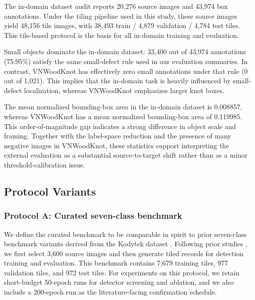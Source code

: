 \documentclass[10pt,a4paper]{article}
\begin{document}
The in-domain dataset audit reports 20,276 source images and 43,974 box annotations. Under the tiling pipeline used in this study, these source images yield 48,156 tile images, with 38,493 train / 4,879 validation / 4,784 test tiles. This tile-based protocol is the basis for all in-domain training and evaluation.

Small objects dominate the in-domain dataset: 33,400 out of 43,974 annotations (75.95\%) satisfy the same small-defect rule used in our evaluation summaries. In contrast, VNWoodKnot has effectively zero small annotations under that rule (0 out of 1,021). This implies that the in-domain task is heavily influenced by small-defect localization, whereas VNWoodKnot emphasizes larger knot boxes.

The mean normalized bounding-box area in the in-domain dataset is 0.008857, whereas VNWoodKnot has a mean normalized bounding-box area of 0.119985. This order-of-magnitude gap indicates a strong difference in object scale and framing. Together with the label-space reduction and the presence of many negative images in VNWoodKnot, these statistics support interpreting the external evaluation as a substantial source-to-target shift rather than as a minor threshold-calibration issue.

\subsection{Protocol Variants}
\label{sec:protocol}

\subsubsection{Protocol A: Curated seven-class benchmark}
We define the curated benchmark to be comparable in spirit to prior seven-class benchmark variants derived from the Kodytek dataset \citep{kodytek_dataset}. Following prior studies \citep{odca_yolo,bpn_yolo,sim_yolo,fdd_yolo,an_cwb_yolov8}, we first select 3,600 source images and then generate tiled records for detection training and evaluation. This benchmark contains 7,679 training tiles, 977 validation tiles, and 972 test tiles. For experiments on this protocol, we retain short-budget 50-epoch runs for detector screening and ablation, and we also include a 200-epoch run as the literature-facing confirmation schedule.
\end{document}
